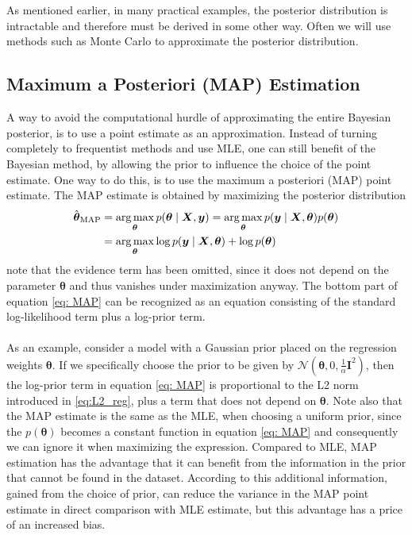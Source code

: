 \\
\\
As mentioned earlier, in many practical examples, the posterior distribution is intractable and therefore must be derived in some other way. Often we will use methods such as Monte Carlo to approximate the posterior distribution. 

\subsection{Maximum a Posteriori (MAP) Estimation}
A way to avoid the computational hurdle of approximating the entire Bayesian posterior, is to use a point estimate as an approximation. Instead of turning completely to frequentist methods and use MLE, one can still benefit of the Bayesian method, by allowing the prior to influence the choice of the point estimate. One way to do this, is to use the maximum a posteriori (MAP) point estimate. The MAP estimate is obtained by maximizing the posterior distribution
\begin{equation}\label{eq: MAP}
  \begin{split}
        \hat{\boldsymbol{\theta}}_{\text{MAP}}&=\operatorname*{arg\,max}_{\boldsymbol{\theta}}{p(\boldsymbol{\theta}\mid \boldsymbol{X},\boldsymbol{y}})=\operatorname*{arg\,max}_{\boldsymbol{\theta}}{p(\boldsymbol{y}\mid \boldsymbol{X},\boldsymbol{\theta}}) p(\boldsymbol{\theta})\\
        &=\operatorname*{arg\,max}_{\boldsymbol{\theta}}{\log p(\boldsymbol{y}\mid \boldsymbol{X},\boldsymbol{\theta}})+ \log p(\boldsymbol{\theta})
  \end{split}
\end{equation}
note that the evidence term has been omitted, since it does not depend on the parameter $\boldsymbol{\theta}$ and thus vanishes under maximization anyway. The bottom part of equation \ref{eq: MAP} can be recognized as an equation consisting of the standard log-likelihood term plus a log-prior term. \\
\\
As an example, consider a model with a Gaussian prior placed on the regression weights $\boldsymbol{\theta}$. If we specifically choose the prior to be given by $\mathcal{N}\left(\boldsymbol{\theta},0,\frac{1}{\alpha}\boldsymbol{I}^2\right)$, then the log-prior term in equation \ref{eq: MAP} is proportional to the L2 norm introduced in \ref{eq:L2_reg}, plus a term that does not depend on $\boldsymbol{\theta}$.
Note also that the MAP estimate is the same as the MLE, when choosing a uniform prior, since the $p(\boldsymbol{\theta})$ becomes a constant function in equation \ref{eq: MAP} and consequently we can ignore it when maximizing the expression. Compared to MLE, MAP estimation has the advantage that it can benefit from the information in the prior that cannot be found in the dataset. According to \cite{Goodfellow-et-al-2016} this additional information, gained from the choice of prior, can reduce the variance in the MAP point estimate in direct comparison with MLE estimate, but this advantage has a price of an increased bias.
